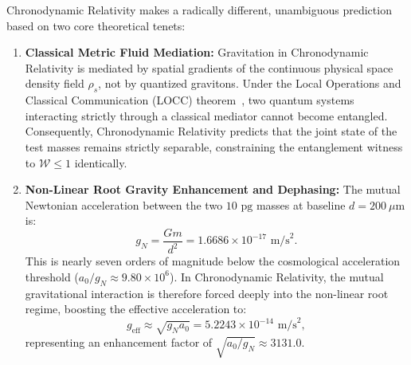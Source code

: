 \documentclass[aps,prd,reprint,superscriptaddress,nofootinbib,twocolumn,floatfix]{revtex4-2}
\begin{document}
Chronodynamic Relativity makes a radically different, unambiguous prediction based on two core theoretical tenets:
\begin{enumerate}\setlength{\itemsep}{1pt}\setlength{\parskip}{0pt}
    \item \textbf{Classical Metric Fluid Mediation:} Gravitation in Chronodynamic Relativity is mediated by spatial gradients of the continuous physical space density field $\rho_s$, not by quantized gravitons. Under the Local Operations and Classical Communication (LOCC) theorem~\cite{marletto2017gravitationally}, two quantum systems interacting strictly through a classical mediator cannot become entangled. Consequently, Chronodynamic Relativity predicts that the joint state of the test masses remains strictly separable, constraining the entanglement witness to $\mathcal{W} \le 1$ identically.
    \item \textbf{Non-Linear Root Gravity Enhancement and Dephasing:} The mutual Newtonian acceleration between the two $10\text{ pg}$ masses at baseline $d = 200\ \mu\text{m}$ is:
    \begin{equation}
    g_N = \frac{G m}{d^2} = 1.6686 \times 10^{-17}\text{ m/s}^2.
    \end{equation}
    This is nearly seven orders of magnitude below the cosmological acceleration threshold ($a_0 / g_N \approx 9.80 \times 10^6$). In Chronodynamic Relativity, the mutual gravitational interaction is therefore forced deeply into the non-linear root regime, boosting the effective acceleration to:
    \begin{equation}
    g_{\text{eff}} \approx \sqrt{g_N a_0} = 5.2243 \times 10^{-14}\text{ m/s}^2,
    \end{equation}
    representing an enhancement factor of $\sqrt{a_0 / g_N} \approx 3131.0$.
\end{enumerate}
\end{document}
